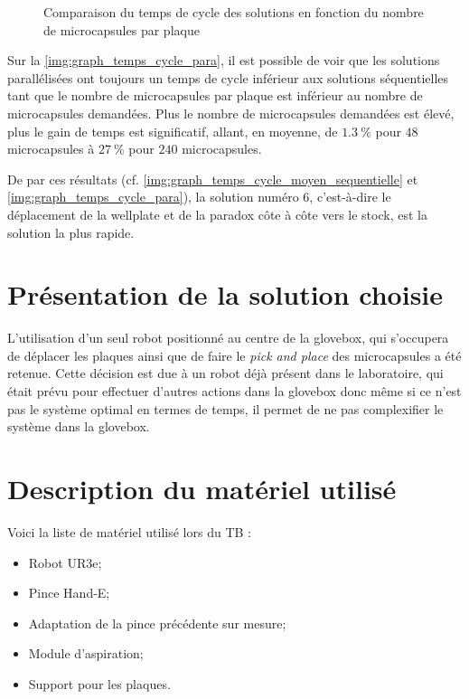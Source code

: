 \begin{figure}[H]
    \centering
    
    \caption{Comparaison du temps de cycle des solutions en fonction du nombre de \glspl{microcapsule} par plaque}
    \label{img:graph_temps_cycle_para}
\end{figure}

Sur la \autoref{img:graph_temps_cycle_para}, il est possible de voir que les solutions parallélisées ont toujours un temps de cycle inférieur aux solutions séquentielles tant que le nombre de \glspl{microcapsule} par plaque est inférieur au nombre de microcapsules demandées.
Plus le nombre de \glspl{microcapsule} demandées est élevé, plus le gain de temps est significatif, allant, en moyenne, de $1.3~\%$ pour $48$ \glspl{microcapsule} à $27~\%$ pour $240$ \glspl{microcapsule}.

De par ces résultats (cf. \autoref{img:graph_temps_cycle_moyen_sequentielle} et \autoref{img:graph_temps_cycle_para}), la solution numéro $6$, c'est-à-dire le déplacement de la \gls{wellplate} et de la \gls{paradox} côte à côte vers le stock, est la solution la plus rapide.
\section{Présentation de la solution choisie}
L'utilisation d'un seul robot positionné au centre de la \gls{glovebox}, qui s'occupera de déplacer les plaques ainsi que de faire le \textit{pick and place} des \glspl{microcapsule} a été retenue.
Cette décision est due à un robot déjà présent dans le laboratoire, qui était prévu pour effectuer d'autres actions dans la \gls{glovebox} donc même si ce n'est pas le système optimal en termes de temps, il permet de ne pas complexifier le système dans la \gls{glovebox}.
\section{Description du matériel utilisé}
Voici la liste de matériel utilisé lors du TB : 
\begin{itemize}
    \item Robot \og{}UR3e\fg{};
    \item Pince \og{}Hand-E\fg{};
    \item Adaptation de la pince précédente sur mesure;
    \item Module d'aspiration;
    \item Support pour les plaques.
\end{itemize}
